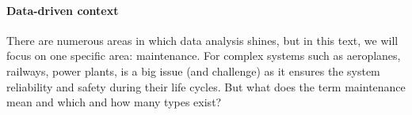 \paragraph{Data-driven context}
There are numerous areas in which data analysis shines, but in this text, we will focus on one specific area: maintenance.
For complex systems such as aeroplanes, railways, power plants, is a big issue (and challenge) as it ensures the system reliability and safety during their life cycles.
But what does the term maintenance mean and which and how many types exist?